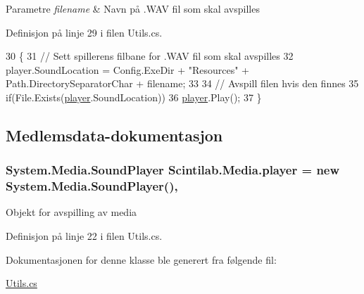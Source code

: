 \begin{DoxyParams}{Parametre}
{\em filename} & Navn på .W\+A\+V fil som skal avspilles \\
\hline
\end{DoxyParams}


Definisjon på linje 29 i filen Utils.\+cs.


\begin{DoxyCode}
30         \{
31             \textcolor{comment}{// Sett spillerens filbane for .WAV fil som skal avspilles}
32             player.SoundLocation = Config.ExeDir + \textcolor{stringliteral}{"Resources"} + Path.DirectorySeparatorChar + filename;
33 
34             \textcolor{comment}{// Avspill filen hvis den finnes}
35             \textcolor{keywordflow}{if}(File.Exists(\hyperlink{class_scintilab_1_1_media_a24bef6120f62f310fb31715fa05ad8d0}{player}.SoundLocation))
36                 \hyperlink{class_scintilab_1_1_media_a24bef6120f62f310fb31715fa05ad8d0}{player}.Play();
37         \}
\end{DoxyCode}


\subsection{Medlemsdata-\/dokumentasjon}
\hypertarget{class_scintilab_1_1_media_a24bef6120f62f310fb31715fa05ad8d0}{
\subsubsection[{player}]{\setlength{\rightskip}{0pt plus 5cm}System.\+Media.\+Sound\+Player Scintilab.\+Media.\+player = new System.\+Media.\+Sound\+Player()\hspace{0.3cm}{\ttfamily [static]}, {\ttfamily [private]}}}\label{class_scintilab_1_1_media_a24bef6120f62f310fb31715fa05ad8d0}
Objekt for avspilling av media 

Definisjon på linje 22 i filen Utils.\+cs.



Dokumentasjonen for denne klasse ble generert fra følgende fil\+:\begin{DoxyCompactItemize}
\item 
\hyperlink{_utils_8cs}{Utils.\+cs}\end{DoxyCompactItemize}

